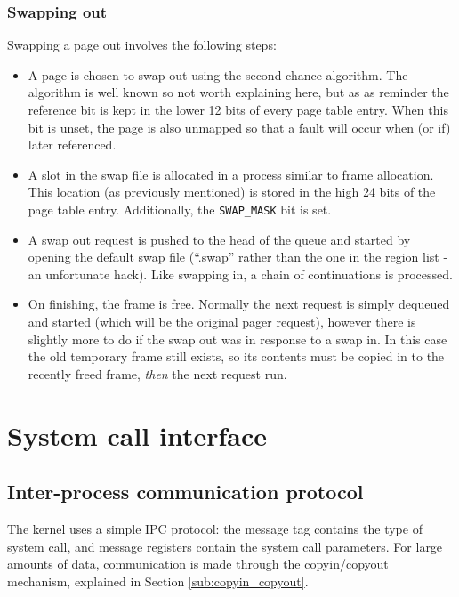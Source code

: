\documentclass[12pt,english]{article}
\begin{document}
\subsubsection{Swapping out}

Swapping a page out involves the following steps:
\begin{itemize}
\item A page is chosen to swap out using the second chance algorithm.  The algorithm is well known so not worth explaining here, but as as reminder the reference bit is kept in the lower 12 bits of every page table entry.  When this bit is unset, the page is also unmapped so that a fault will occur when (or if) later referenced.
\item A slot in the swap file is allocated in a process similar to frame allocation.  This location (as previously mentioned) is stored in the high 24 bits of the page table entry.  Additionally, the \texttt{SWAP\_MASK} bit is set.
\item A swap out request is pushed to the head of the queue and started by opening the default swap file (``.swap'' rather than the one in the region list - an unfortunate hack).  Like swapping in, a chain of continuations is processed.
\item On finishing, the frame is free.  Normally the next request is simply dequeued and started (which will be the original pager request), however there is slightly more to do if the swap out was in response to a swap in.  In this case the old temporary frame still exists, so its contents must be copied in to the recently freed frame, \emph{then} the next request run.
\end{itemize}



\section{System call interface} \label{sub:system_call_interface}

\subsection{Inter-process communication protocol}

The kernel uses a simple IPC protocol: the message tag contains the type of system call, and message registers contain the system call parameters.  For large amounts of data, communication is made through the copyin/copyout mechanism, explained in Section \ref{sub:copyin_copyout}.
\end{document}
